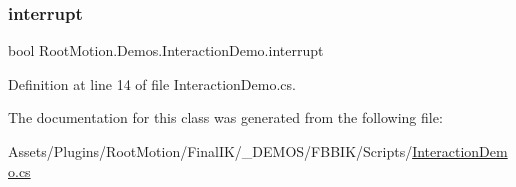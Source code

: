 \subsubsection{\texorpdfstring{interrupt}{interrupt}}
{\footnotesize\ttfamily bool Root\+Motion.\+Demos.\+Interaction\+Demo.\+interrupt}



Definition at line 14 of file Interaction\+Demo.\+cs.



The documentation for this class was generated from the following file\+:\begin{DoxyCompactItemize}
\item 
Assets/\+Plugins/\+Root\+Motion/\+Final\+I\+K/\+\_\+\+D\+E\+M\+O\+S/\+F\+B\+B\+I\+K/\+Scripts/\mbox{\hyperlink{_interaction_demo_8cs}{Interaction\+Demo.\+cs}}\end{DoxyCompactItemize}
